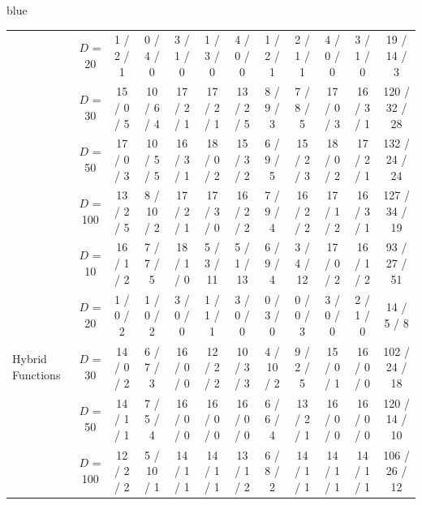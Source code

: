 \documentclass[journal, onecolumn]{IEEEtran}
\begin{document}
\begin{color}{blue}
\begin{table}[h]
{\begin{tabular}{l|c|ccc|cccccc|c}
			& $D$ = 20 & 1 / 2 / 1
			& 0 / 4 / 0
			& 3 / 1 / 0
			& 1 / 3 / 0
			& 4 / 0 / 0
			& 1 / 2 / 1
			& 2 / 1 / 1
			& 4 / 0 / 0
			& 3 / 1 / 0
			& 19 / 14 / 3 \\
			& $D$ = 30 & 15 / 0 / 5
			& 10 / 6 / 4
			& 17 / 2 / 1
			& 17 / 2 / 1
			& 13 / 2 / 5
			& 8 / 9 / 3
			& 7 / 8 / 5
			& 17 / 0 / 3
			& 16 / 3 / 1
			& 120 / 32 / 28 \\
			& $D$ = 50 & 17 / 0 / 3
			& 10 / 5 / 5
			& 16 / 3 / 1
			& 18 / 0 / 2
			& 15 / 3 / 2
			& 6 / 9 / 5
			& 15 / 2 / 3
			& 18 / 0 / 2
			& 17 / 2 / 1
			& 132 / 24 / 24 \\
			& $D$ = 100 & 13 / 2 / 5
			& 8 / 10 / 2
			& 17 / 2 / 1
			& 17 / 3 / 0
			& 16 / 2 / 2
			& 7 / 9 / 4
			& 16 / 2 / 2
			& 17 / 1 / 2
			& 16 / 3 / 1
			& 127 / 34 / 19 \\
			\hline																							
			\multirow{5}{*}{Hybrid Functions}	
			& $D$ = 10   & 16 / 1 / 2
			& 7 / 7 / 5
			& 18 / 1 / 0
			& 5 / 3 / 11
			& 5 / 1 / 13
			& 6 / 9 / 4
			& 3 / 4 / 12
			& 17 / 0 / 2
			& 16 / 1 / 2
			& 93 / 27 / 51 \\
			& 	$D$ = 20 & 1 / 0 / 2
			& 1 / 0 / 2
			& 3 / 0 / 0
			& 1 / 1 / 1
			& 3 / 0 / 0
			& 0 / 3 / 0
			& 0 / 0 / 3
			& 3 / 0 / 0
			& 2 / 1 / 0
			& 14 / 5 / 8 \\
			& $D$ = 30 & 14 / 0 / 2
			& 6 / 7 / 3
			& 16 / 0 / 0
			& 12 / 2 / 2
			& 10 / 3 / 3
			& 4 / 10 / 2
			& 9 / 2 / 5
			& 15 / 0 / 1
			& 16 / 0 / 0
			& 102 / 24 / 18 \\
			& $D$ = 50 & 14 / 1 / 1
			& 7 / 5 / 4
			& 16 / 0 / 0
			& 16 / 0 / 0
			& 16 / 0 / 0
			& 6 / 6 / 4
			& 13 / 2 / 1
			& 16 / 0 / 0
			& 16 / 0 / 0
			& 120 / 14 / 10 \\
			& $D$ = 100 & 12 / 2 / 2
			& 5 / 10 / 1
			& 14 / 1 / 1
			& 14 / 1 / 1
			& 13 / 1 / 2
			& 6 / 8 / 2
			& 14 / 1 / 1
			& 14 / 1 / 1
			& 14 / 1 / 1
			& 106 / 26 / 12 \\
			\hline	
			

\end{tabular}}
\end{table}
\end{color}
\end{document}
